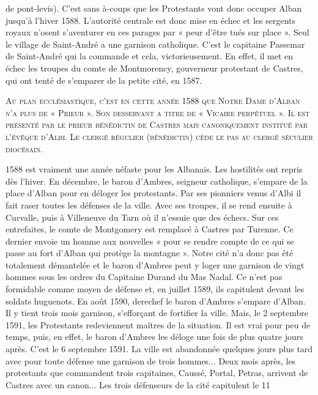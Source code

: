 
de pont-levis). C'est sans à-coups que les Protestants vont donc occuper Alban jusqu'à l'hiver 1588. L'autorité centrale est donc mise en échec et les sergents royaux n'osent s'aventurer en ces parages par « peur d'être tués sur place ». Seul le village de Saint-André a une garnison catholique. C'est le capitaine Passemar de Saint-André qui la commande et cela, victorieusement. En effet, il met en échec les troupes du comte de Montmorency, gouverneur protestant de Castres, qui ont tenté de s'emparer de la petite cité, en 1587.

\lettrine{A}{u plan ecclésiastique, c'est en cette année 1588 que Notre Dame d'Alban n'a plus de « Prieur ». Son desservant a titre de « Vicaire perpétuel ». Il est présenté par le prieur bénédictin de Castres mais canoniquement institué par l'évêque d'Albi. Le clergé régulier (bénédictin) cède le pas au clergé séculier diocésain.}

1588 est vraiment une année néfaste pour les Albanais. Les hostilités ont repris dès l'hiver. En décembre, le baron d'Ambres, seigneur catholique, s'empare de la place d'Alban pour en déloger les protestants. Par ses pionniers venus d'Albi il fait raser toutes les défenses de la ville. Avec ses troupes, il se rend ensuite à Curvalle, puis à Villeneuve du Tarn où il n'essuie que des échecs. Sur ces entrefaites, le comte de Montgomery est remplacé à Castres par Turenne. Ce dernier envoie un homme aux nouvelles « pour se rendre compte de ce qui se passe au fort d'Alban qui protège la montagne ». Notre cité n'a donc pas été totalement démantelée et le baron d'Ambres peut y loger une garnison de vingt hommes sous les ordres du Capitaine Durand du Mas Nadal. Ce n'est pas formidable comme moyen de défense et, en juillet 1589, ils capitulent devant les soldats huguenots. En août 1590, derechef le baron d'Ambres s'empare d'Alban. Il y tient trois mois garnison, s'efforçant de fortifier la ville. Mais, le 2 septembre 1591, les Protestants redeviennent maîtres de la situation. Il est vrai pour peu de temps, puis, en effet, le baron d'Ambres les déloge une fois de plus quatre jours après. C'est le 6 septembre 1591. La ville est abandonnée quelques jours plus tard avec pour toute défense une garnison de trois hommes... Deux mois après, les protestants que commandent trois capitaines, Caussé, Portal, Petras, arrivent de Castres avec un canon... Les trois défenseurs de la cité capitulent le 11
